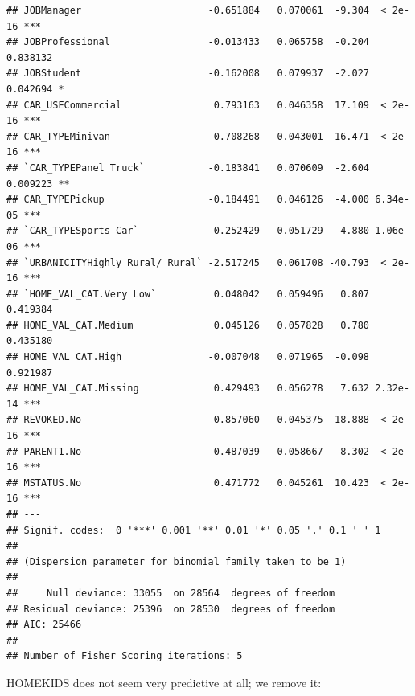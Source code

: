 \documentclass[
]{article}
\begin{document}
\begin{verbatim}
## JOBManager                      -0.651884   0.070061  -9.304  < 2e-16 ***
## JOBProfessional                 -0.013433   0.065758  -0.204 0.838132    
## JOBStudent                      -0.162008   0.079937  -2.027 0.042694 *  
## CAR_USECommercial                0.793163   0.046358  17.109  < 2e-16 ***
## CAR_TYPEMinivan                 -0.708268   0.043001 -16.471  < 2e-16 ***
## `CAR_TYPEPanel Truck`           -0.183841   0.070609  -2.604 0.009223 ** 
## CAR_TYPEPickup                  -0.184491   0.046126  -4.000 6.34e-05 ***
## `CAR_TYPESports Car`             0.252429   0.051729   4.880 1.06e-06 ***
## `URBANICITYHighly Rural/ Rural` -2.517245   0.061708 -40.793  < 2e-16 ***
## `HOME_VAL_CAT.Very Low`          0.048042   0.059496   0.807 0.419384    
## HOME_VAL_CAT.Medium              0.045126   0.057828   0.780 0.435180    
## HOME_VAL_CAT.High               -0.007048   0.071965  -0.098 0.921987    
## HOME_VAL_CAT.Missing             0.429493   0.056278   7.632 2.32e-14 ***
## REVOKED.No                      -0.857060   0.045375 -18.888  < 2e-16 ***
## PARENT1.No                      -0.487039   0.058667  -8.302  < 2e-16 ***
## MSTATUS.No                       0.471772   0.045261  10.423  < 2e-16 ***
## ---
## Signif. codes:  0 '***' 0.001 '**' 0.01 '*' 0.05 '.' 0.1 ' ' 1
## 
## (Dispersion parameter for binomial family taken to be 1)
## 
##     Null deviance: 33055  on 28564  degrees of freedom
## Residual deviance: 25396  on 28530  degrees of freedom
## AIC: 25466
## 
## Number of Fisher Scoring iterations: 5
\end{verbatim}

HOMEKIDS does not seem very predictive at all; we remove it:
\end{document}
